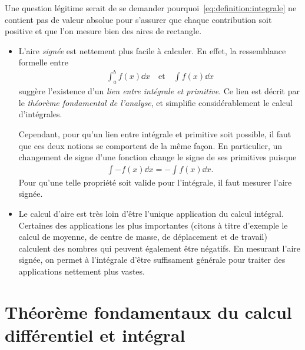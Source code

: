 \documentclass[main.tex]{subfiles}
\begin{document}
\begin{remark}

    Une question légitime serait de se demander pourquoi~\eqref{eq:definition:integrale} ne contient pas de valeur absolue
    pour s'assurer que chaque contribution soit positive
    et que l'on mesure bien des aires de rectangle.

    \begin{itemize}
        \item L'aire \emph{signée} est nettement plus facile à calculer.
            En effet, la ressemblance formelle entre
            \begin{align}
                \int_a^b f(x) \dd x
                \quad \text{et} \quad
                \int f(x) \dd x
            \end{align}
            suggère l'existence d'un \emph{lien entre intégrale et primitive}.
            Ce lien est décrit par le \emph{théorème fondamental de l'analyse},
            et simplifie considérablement le calcul d'intégrales.

            Cependant, pour qu'un lien entre intégrale et primitive soit possible,
            il faut que ces deux notions se comportent de la même façon.
            En particulier,
            un changement de signe d'une fonction
            change le signe de ses primitives puisque
            \begin{align}
                \int -f(x) \dd x = - \int f(x) \dd x.
            \end{align}
            Pour qu'une telle propriété soit valide pour l'intégrale,
            il faut mesurer l'aire signée.
        \item Le calcul d'aire est très loin d'être l'unique application du calcul intégral.
            Certaines des applications les plus importantes
            (citons à titre d'exemple le calcul de moyenne, de centre de masse, de déplacement et de travail)
            calculent des nombres qui peuvent également être négatifs.
            En mesurant l'aire signée,
            on permet à l'intégrale d'être suffisament générale pour traiter des applications nettement plus vastes.
    \end{itemize}
\end{remark}

\section{Théorème fondamentaux du calcul différentiel et intégral}
\end{document}
